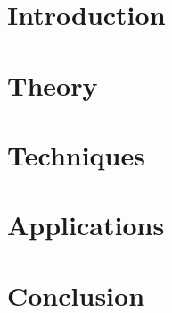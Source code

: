 






 

\begin{titlepage}


\end{titlepage}


\setcounter{savepage}{\value{page}}


\section{Introduction}

\clearpage

\section{Theory}

\clearpage

\section{Techniques}

\clearpage

\section{Applications}

\clearpage

\section{Conclusion}


\singlespacing
\clearpage
\appendix
{}
\setcounter{page}{\numexpr\value{savepage}}





